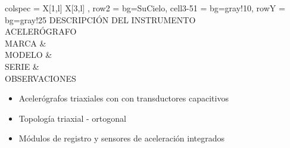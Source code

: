 \begin{longtblr}{
		colspec = {
			X[1,l]
			X[3,l]
		},
		row{2} = {bg=SuCielo},
		cell{3-5}{1} = {bg=gray!10},
		row{Y} = {bg=gray!25}
	}
	 DESCRIPCIÓN DEL INSTRUMENTO \\
	 ACELERÓGRAFO \MakeUppercase{} \\
	MARCA &  \\
	MODELO &  \\
	SERIE &  \\
	 OBSERVACIONES \\
	 \begin{itemize}
		\item Acelerógrafos triaxiales con  con transductores capacitivos
		\item Topología triaxial - ortogonal
		\item Módulos de registro y sensores de aceleración integrados
	\end{itemize}
\end{longtblr}
